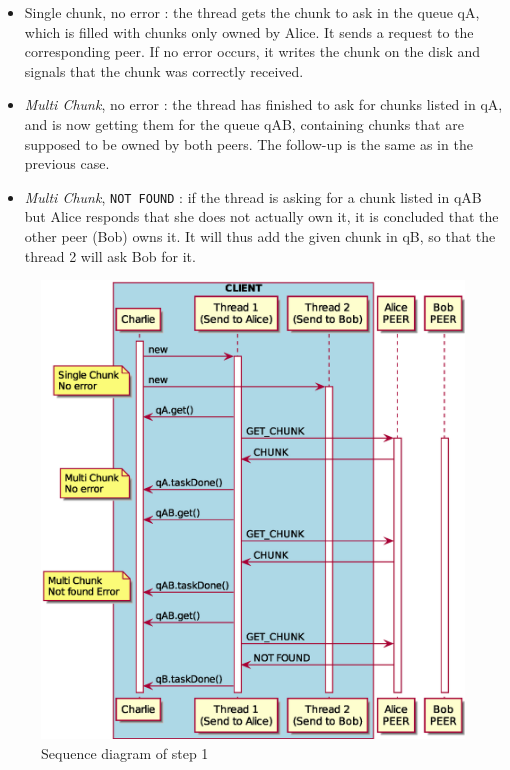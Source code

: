 \begin{itemize}
	\item Single chunk, no error : the thread gets the chunk to ask in the queue qA, which is filled with chunks only owned by Alice. It sends a request to the corresponding peer. If no error occurs, it writes the chunk on the disk and signals that the chunk was correctly received.
	
	\item \textit{Multi Chunk}, no error : the thread has finished to ask for chunks listed in qA, and is now getting them for the queue qAB, containing chunks that are supposed to be owned by both peers. The follow-up is the same as in the previous case.
	
	\item \textit{Multi Chunk}, \texttt{NOT FOUND} : if the thread is asking for a chunk listed in qAB but Alice responds that she does not actually own it, it is concluded that the other peer (Bob) owns it. It will thus add the given chunk in qB, so that the thread 2 will ask Bob for it.
\end{itemize}

\begin{figure}
	\centering
	\includegraphics[width=\textwidth]{img/step1.eps}
	\caption{Sequence diagram of step 1}
	\label{fig:step1}
\end{figure}
